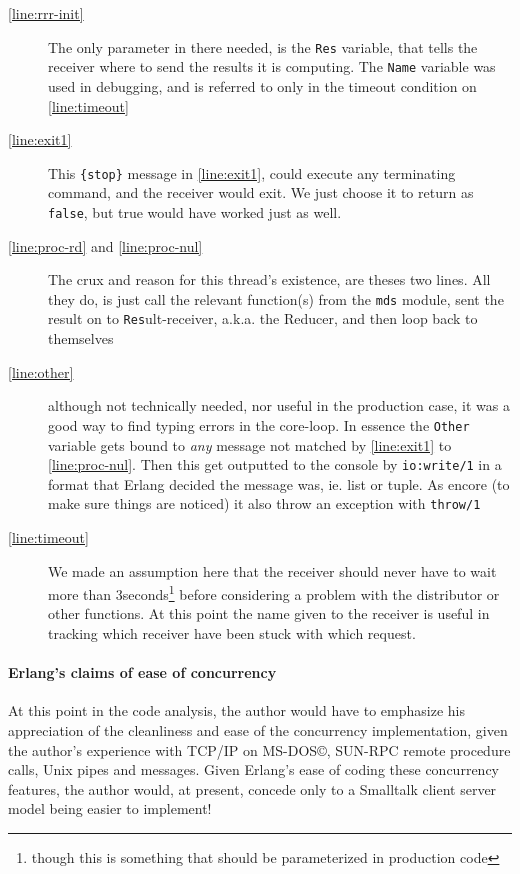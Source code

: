 \begin{description}
\item[\autoref{line:rrr-init}] The only parameter in there needed, is
  the \texttt{Res} variable, that tells the receiver where to send the
  results it is computing. The \texttt{Name} variable was used in
  debugging, and is referred to only in the timeout condition on \autoref{line:timeout}
\item[\autoref{line:exit1}] This \texttt{\{stop\}} message in
  \autoref{line:exit1}, could execute any terminating command, and the
  receiver would exit. We just choose it to return as \texttt{false},
  but true would have worked just as well.  
\item[\autoref{line:proc-rd} and \ref{line:proc-nul}] The crux and
  reason for this thread's existence, are theses two lines. All they
  do, is just call the relevant function(s) from the \texttt{mds}
  module, sent the result on to \texttt{Res}ult-receiver, a.k.a. the
  Reducer, and then loop back to themselves
\item[\autoref{line:other}] although not technically needed, nor
  useful in the production case, it was a good way to find typing
  errors in the core-loop. In essence the \texttt{Other} variable gets
  bound to \emph{any} message not matched by \autoref{line:exit1} to
  \autoref{line:proc-nul}. Then this get outputted to the console by
  \texttt{io:write/1} in a format that Erlang decided the message was,
  ie. list or tuple. As encore (to make sure things are noticed) it
  also throw an exception with \texttt{throw/1}
\item[\autoref{line:timeout}] We made an assumption here that the
  receiver should never have to wait more than
  3seconds\footnote{though this is something that should be
    parameterized in production code} before considering a problem
  with the distributor or other functions. At this point the name
  given to the receiver is useful in tracking which receiver have been
  stuck with which request.
\end{description}

\paragraph{Erlang's claims of ease of concurrency}
\label{sec:erlangs-claims-ease}

At this point in the code analysis, the author would have to emphasize
his appreciation of the cleanliness and ease of the concurrency
implementation, given the author's experience with TCP/IP on
MS-DOS\copyright, SUN-RPC remote procedure calls, Unix pipes and
messages. Given Erlang's ease of coding these concurrency features,
the author would, at present, concede only to a Smalltalk client
server model being easier to implement!

